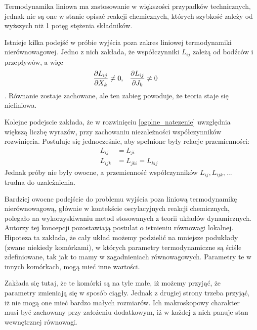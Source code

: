 \documentclass[10pt, a4paper, twoside, onecolumn]{article}
\numberwithin{equation}{section}
\begin{document}
	Termodynamika liniowa ma zastosowanie w większości przypadków technicznych, jednak nie są one w stanie opisać reakcji chemicznych, których szybkość zależy od wyższych niż 1 potęg stężenia składników. \par
	Istnieje kilka podejść w próbie wyjścia poza zakres liniowej termodynamiki nierównowagowej. Jedno z nich zakłada, że współczynniki \(L_{ij}\) zależą od bodźców i przepływów, a więc
	\begin{align}
		& \pdv{L_{ij}}{X_{k}}\neq 0, && \pdv{L_{ij}}{J_{k}}\neq 0
	\end{align}. 
	Równanie 
	zostaje zachowane, ale ten zabieg powoduje, że teoria staje się nieliniowa. \par
	Kolejne podejscie zakłada, że w rozwinięciu \eqref{ogolne_natezenie} uwzględnia większą liczbę wyrazów, przy zachowaniu niezależności współczynników rozwinięcia. Postuluje się jednocześnie, aby spełnione były relacje przemienności:
	\begin{align}
		L_{ij} &= L_{ji} \\
		L_{ijk} &= L_{jki} = L_{kij}
	\end{align}
	Jednak próby nie były owocne, a przemienność współczynników \(L_{ij}, L_{ijk}, \ldots\) trudna do uzależnienia. \par
	Bardziej owocne podejście do problemu wyjścia poza liniową termodynamikę nierównowagową, głównie w kontekście oscylacyjnych reakcji chemicznych, polegało na wykorzyskiwaniu metod stosowanych z teorii układów dynamicznych. Autorzy tej koncepcji pozostawiają postulat o istnieniu równowagi lokalnej. Hipoteza ta zakłada, że cały układ możemy podzielić na mniejsze podukłady (zwane niekiedy komórkami), w których parametry termodynamiczne są ściśle zdefiniowane, tak jak to mamy w zagadnieniach równowagowych. Parametry te w innych komórkach, mogą mieć inne wartości. \par
	Zakłada się tutaj, że te komórki są na tyle małe, iż możemy przyjąć, że parametry zmieniają się w sposób ciągły. Jednak z drugiej strony trzeba przyjąć, iż nie mogą one mieć bardzo małych rozmiarów. Ich makroskopowy charakter musi być zachowany przy założeniu dodatkowym, iż w każdej z nich panuje stan wewnętrznej równowagi. 
	
	
	
	
	
\end{document}
